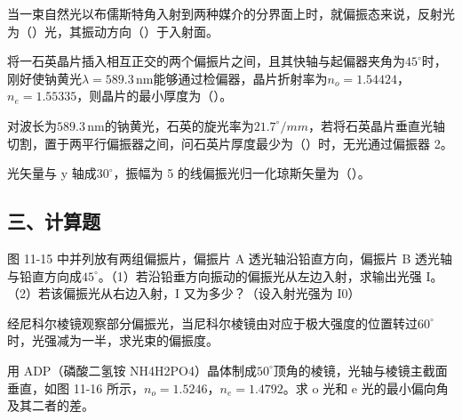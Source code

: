 \documentclass[standard, analysis, notocnum]{ExBook}
\newcommand{\answerarea}[1][8cm]{%
  \par\vspace{2mm}%
  \noindent{\color{themeColor!35}\rule{\linewidth}{0.4pt}}\par
  \noindent\begin{minipage}[t][#1][t]{\linewidth}\vspace{0pt}\end{minipage}\par
  \noindent{\color{themeColor!35}\rule{\linewidth}{0.4pt}}\par
}
\begin{document}
\begin{qitems}
\begin{bbox}
\qitem 当一束自然光以布儒斯特角入射到两种媒介的分界面上时，就偏振态来说，反射光为（\hspace{1.6em}）光，其振动方向（\hspace{1.6em}）于入射面。
\answerarea[3.5cm]
\end{bbox}
\begin{bbox}
\qitem 将一石英晶片插入相互正交的两个偏振片之间，且其快轴与起偏器夹角为$45^{\circ}$时，刚好使钠黄光$\lambda =589.3\,\mathrm{nm}$能够通过检偏器，晶片折射率为$n_{o}=1.54424$，$n_{e}=1.55335$，则晶片的最小厚度为（\hspace{1.6em}）。
\answerarea[3.5cm]
\end{bbox}
\begin{bbox}
\qitem 对波长为$589.3\,\mathrm{nm}$的钠黄光，石英的旋光率为$21.7^{\circ}/mm$，若将石英晶片垂直光轴切割，置于两平行偏振器之间，问石英片厚度最少为（\hspace{1.6em}）时，无光通过偏振器 2。
\answerarea[3.5cm]
\end{bbox}
\begin{bbox}
\qitem 光矢量与 y 轴成$30^{\circ}$，振幅为 5 的线偏振光归一化琼斯矢量为（\hspace{1.6em}）。
\answerarea[3.5cm]
\end{bbox}
\end{qitems}

\subsection{三、计算题}
\begin{qitems}[startnum=1]
\qitem 图 11-15 中并列放有两组偏振片，偏振片 A 透光轴沿铅直方向，偏振片 B 透光轴与铅直方向成$45^{\circ}$。（1）若沿铅垂方向振动的偏振光从左边入射，求输出光强 I。（2）若该偏振光从右边入射，I 又为多少？（设入射光强为 I0）
\label{q:272:start}
\answerarea[8cm]
\label{q:272:end}
\end{qitems}

\begin{qitems}[startnum=2]
\qitem 经尼科尔棱镜观察部分偏振光，当尼科尔棱镜由对应于极大强度的位置转过$60^{\circ}$时，光强减为一半，求光束的偏振度。
\label{q:273:start}
\answerarea[8cm]
\label{q:273:end}
\end{qitems}

\begin{qitems}[startnum=3]
\qitem 用 ADP（磷酸二氢铵 NH4H2PO4）晶体制成$50^{\circ}$顶角的棱镜，光轴与棱镜主截面垂直，如图 11-16 所示，$n_{o}=1.5246$，$n_{e}=1.4792$。求 o 光和 e 光的最小偏向角及其二者的差。
\label{q:274:start}
\answerarea[8cm]
\label{q:274:end}
\end{qitems}
\end{document}
